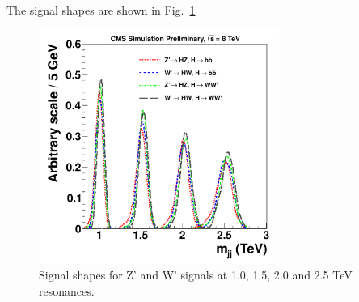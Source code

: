 The signal shapes are shown in Fig.~\ref{fig:HbbZqqShape} 
\begin{figure}[ht!b]
\begin{center}
\includegraphics[width=0.7\textwidth]{EXO-14-009/shapeAll.pdf}
\end{center}
\caption{Signal shapes for Z' and W' signals at 1.0, 1.5, 2.0 and 2.5 TeV
 resonances.
}
\label{fig:HbbZqqShape}
\end{figure}






\clearpage

